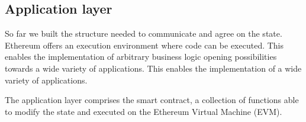 \subsection{Application layer}

So far we built the structure needed to communicate and agree on the state.
Ethereum offers an execution environment where code can be executed. This
enables the implementation of arbitrary business logic opening possibilities
towards a wide variety of applications. This enables the implementation of a
wide variety of applications.

The application layer comprises the smart contract, a collection of functions
able to modify the state and executed on the Ethereum Virtual Machine (EVM).
